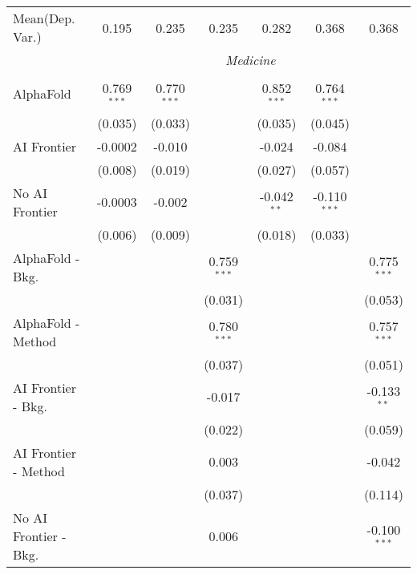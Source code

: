 \begin{tabular}{lcccccc}
Mean(Dep. Var.) & 0.195 & 0.235 & 0.235 & 0.282 & 0.368 & 0.368 \\
 & \multicolumn{6}{c}{\textit{Medicine}} \\ \\
   AlphaFold               & 0.769$^{***}$ & 0.770$^{***}$ &               & 0.852$^{***}$ & 0.764$^{***}$  &   \\   
                           & (0.035)       & (0.033)       &               & (0.035)       & (0.045)        &   \\   
   AI Frontier             & -0.0002       & -0.010        &               & -0.024        & -0.084         &   \\   
                           & (0.008)       & (0.019)       &               & (0.027)       & (0.057)        &   \\   
   No AI Frontier          & -0.0003       & -0.002        &               & -0.042$^{**}$ & -0.110$^{***}$ &   \\   
                           & (0.006)       & (0.009)       &               & (0.018)       & (0.033)        &   \\   
   AlphaFold - Bkg.        &               &               & 0.759$^{***}$ &               &                & 0.775$^{***}$\\   
                           &               &               & (0.031)       &               &                & (0.053)\\   
   AlphaFold - Method      &               &               & 0.780$^{***}$ &               &                & 0.757$^{***}$\\   
                           &               &               & (0.037)       &               &                & (0.051)\\   
   AI Frontier - Bkg.      &               &               & -0.017        &               &                & -0.133$^{**}$\\   
                           &               &               & (0.022)       &               &                & (0.059)\\   
   AI Frontier - Method    &               &               & 0.003         &               &                & -0.042\\   
                           &               &               & (0.037)       &               &                & (0.114)\\   
   No AI Frontier - Bkg.   &               &               & 0.006         &               &                & -0.100$^{***}$\\   

\end{tabular}
